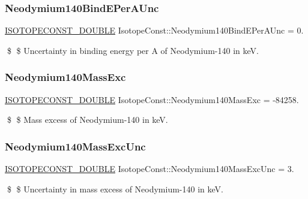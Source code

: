 \subsubsection{\texorpdfstring{Neodymium140\+Bind\+E\+Per\+A\+Unc}{Neodymium140BindEPerAUnc}}
{\footnotesize\ttfamily \mbox{\hyperlink{group___isotope_const-_macros_ga8f45a7272ce02c0b4c65c44636ed719a}{I\+S\+O\+T\+O\+P\+E\+C\+O\+N\+S\+T\+\_\+\+D\+O\+U\+B\+LE}} Isotope\+Const\+::\+Neodymium140\+Bind\+E\+Per\+A\+Unc = 0.}

\$ \$ Uncertainty in binding energy per A of Neodymium-\/140 in keV. \mbox{\label{group___isotope_const-_neodymium-_nd140_ga88052fca3297291d6bcd126483206094}} 
\subsubsection{\texorpdfstring{Neodymium140\+Mass\+Exc}{Neodymium140MassExc}}
{\footnotesize\ttfamily \mbox{\hyperlink{group___isotope_const-_macros_ga8f45a7272ce02c0b4c65c44636ed719a}{I\+S\+O\+T\+O\+P\+E\+C\+O\+N\+S\+T\+\_\+\+D\+O\+U\+B\+LE}} Isotope\+Const\+::\+Neodymium140\+Mass\+Exc = -\/84258.}

\$ \$ Mass excess of Neodymium-\/140 in keV. \mbox{\label{group___isotope_const-_neodymium-_nd140_gaef9f911e6a8f86ac7a4fb40c7d942031}} 
\subsubsection{\texorpdfstring{Neodymium140\+Mass\+Exc\+Unc}{Neodymium140MassExcUnc}}
{\footnotesize\ttfamily \mbox{\hyperlink{group___isotope_const-_macros_ga8f45a7272ce02c0b4c65c44636ed719a}{I\+S\+O\+T\+O\+P\+E\+C\+O\+N\+S\+T\+\_\+\+D\+O\+U\+B\+LE}} Isotope\+Const\+::\+Neodymium140\+Mass\+Exc\+Unc = 3.}

\$ \$ Uncertainty in mass excess of Neodymium-\/140 in keV. \mbox{\label{group___isotope_const-_neodymium-_nd140_ga2c43a59d76a721b5e8a730bf8298f1c2}} 
